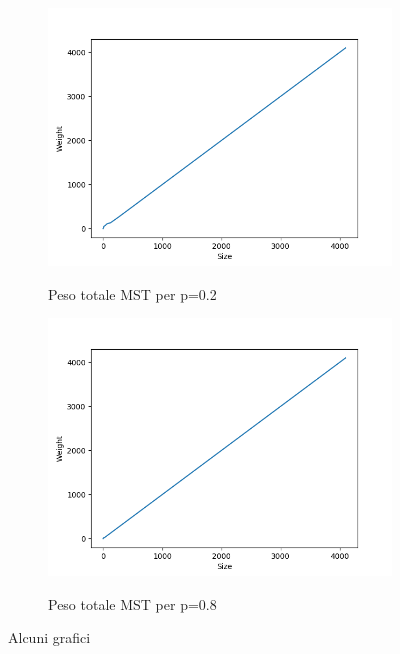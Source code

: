 \documentclass[]{article}
\begin{document}
\begin{figure}[H]
    \centering
    \begin{subfigure}[b]{0.45\linewidth} 
        \centering
        \caption{Peso totale MST per p=0.2}
        \includegraphics[width=\textwidth]{krusk_Weight_p=02}
        \label{fig:krusk_Weight_p=02}
    \end{subfigure}
    \quad
    \begin{subfigure}[b]{0.45\linewidth}
        \centering
        \caption{Peso totale MST per p=0.8}
        \includegraphics[width=\textwidth]{krusk_Weight_p=08}
        \label{fig:krusk_Weight_p=08}
    \end{subfigure}
    \caption{Alcuni grafici}
    \label{fig:mst_weight}
\end{figure}
\end{document}
